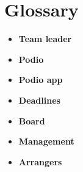 \section{Glossary}
\begin{itemize}
	\item \textbf{Team leader}\\
	\item \textbf{Podio}\\
	\item \textbf{Podio app}
	\item \textbf{Deadlines}\\
	\item \textbf{Board}\\
	\item \textbf{Management}\\
	\item \textbf{Arrangers}\\
\end{itemize}
